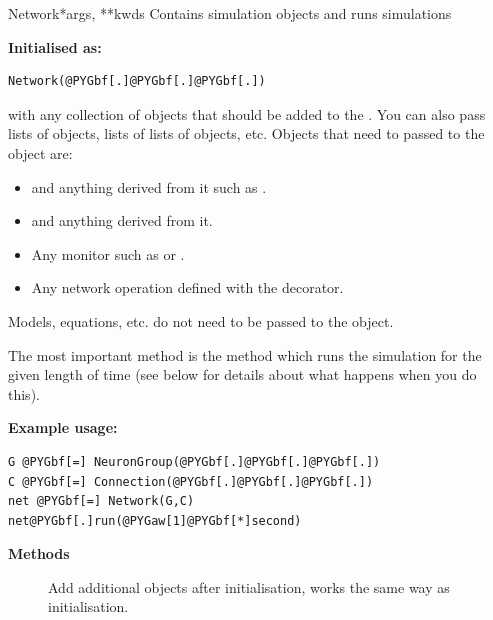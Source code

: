 \documentclass[letterpaper,10pt,english]{manual}
\begin{document}
\hypertarget{brian.Network}{}\begin{classdesc}{Network}{*args, **kwds}
Contains simulation objects and runs simulations

\textbf{Initialised as:}

\begin{Verbatim}[commandchars=@\[\]]
Network(@PYGbf[.]@PYGbf[.]@PYGbf[.])
\end{Verbatim}

with  any collection of objects that should be added to the \hyperlink{brian.Network}{}.
You can also pass lists of objects, lists of lists of objects, etc. Objects
that need to passed to the \hyperlink{brian.Network}{} object are:
\begin{itemize}
\item {} 
\hyperlink{brian.NeuronGroup}{} and anything derived from it such as \hyperlink{brian.PoissonGroup}{}.

\item {} 
\hyperlink{brian.Connection}{} and anything derived from it.

\item {} 
Any monitor such as \hyperlink{brian.SpikeMonitor}{} or \hyperlink{brian.StateMonitor}{}.

\item {} 
Any network operation defined with the \hyperlink{brian.network_operation}{} decorator.

\end{itemize}

Models, equations, etc. do not need to be passed to the \hyperlink{brian.Network}{} object.

The most important method is the  method which runs the simulation
for the given length of time (see below for details about what happens when you
do this).

\textbf{Example usage:}

\begin{Verbatim}[commandchars=@\[\]]
G @PYGbf[=] NeuronGroup(@PYGbf[.]@PYGbf[.]@PYGbf[.])
C @PYGbf[=] Connection(@PYGbf[.]@PYGbf[.]@PYGbf[.])
net @PYGbf[=] Network(G,C)
net@PYGbf[.]run(@PYGaw[1]@PYGbf[*]second)
\end{Verbatim}

\textbf{Methods}
\begin{description}
\item[]
Add additional objects after initialisation, works the same way
as initialisation.


\end{description}
\end{classdesc}
\end{document}

